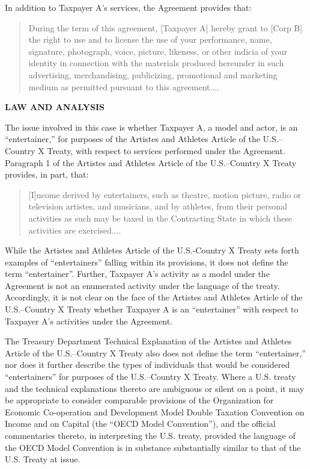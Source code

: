 \begin{select}
In addition to Taxpayer A's services, the Agreement provides that:
\begin{quotation}
During the term of this agreement, [Taxpayer A] hereby grant to [Corp B] the
right to use and to license the use of your performance, name, signature,
photograph, voice, picture, likeness, or other indicia of your identity in
connection with the materials produced hereunder in such advertising,
merchandising, publicizing, promotional and marketing medium as permitted
pursuant to this agreement....
\end{quotation}

\begin{center}\textbf{LAW AND ANALYSIS}
\end{center}
The issue involved in this case is whether Taxpayer A, a model and actor, is
an ``entertainer,'' for purposes of the Artistes and Athletes Article of the U.S.--Country X Treaty, with respect to services performed under the Agreement. 
Paragraph 1 of the Artistes and Athletes Article of the U.S.--Country X Treaty
provides, in part, that:
\begin{quotation}
[I]ncome derived by entertainers, such as theatre, motion picture, radio or
television artistes, and musicians, and by athletes, from their personal
activities as such may be taxed in the Contracting State in which these
activities are exercised....
\end{quotation}
While the Artistes and Athletes Article of the U.S.-Country X Treaty sets forth
examples of ``entertainers'' falling within its provisions, it does not define the term
``entertainer''. Further, Taxpayer A's activity as a model under the Agreement is not
an enumerated activity under the language of the treaty. Accordingly, it is not clear
on the face of the Artistes and Athletes Article of the U.S.--Country X Treaty whether
Taxpayer A is an ``entertainer'' with respect to Taxpayer A's activities under the
Agreement. 

The Treasury Department Technical Explanation of the Artistes and Athletes
Article of the U.S.--Country X Treaty also does not define the term ``entertainer,'' nor
does it further describe the types of individuals that would be considered
``entertainers'' for purposes of the U.S.--Country X Treaty. Where a U.S. treaty and
the technical explanations thereto are ambiguous or silent on a point, it may be
appropriate to consider comparable provisions of the Organization for Economic
Co-operation and Development Model Double Taxation Convention on Income and
on Capital (the ``OECD Model Convention''), and the official commentaries thereto,
in interpreting the U.S. treaty, provided the language of the OECD Model
Convention is in substance substantially similar to that of the U.S. Treaty at issue. 


\end{select}
